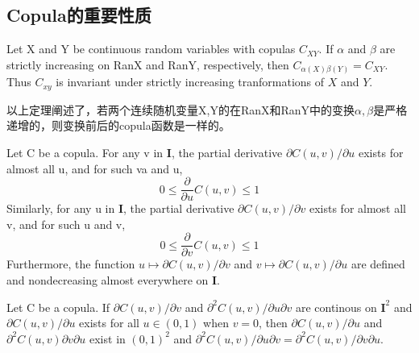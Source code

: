 \subsection{Copula的重要性质}
\begin{theorem}
    Let X and Y be continuous random variables with copulas $C_{XY}$. If $\alpha$ and $\beta$ are strictly increasing on RanX and RanY, respectively, then $C_{\alpha(X)\beta(Y)} = C_{XY}$. Thus \textcolor[rgb]{1,0,0}{$C_{xy}$ is invariant under strictly increasing tranformations of $X$ and $Y$}.
    \label{thr2.4.3}
\end{theorem}
以上定理阐述了，若两个连续随机变量X,Y的在RanX和RanY中的变换$\alpha,\beta$是严格递增的，则变换前后的copula函数是一样的。
\begin{theorem}
    Let C be a copula. For any v in $\mathbf{I}$, the partial derivative $\partial C(u,v)/\partial u$ exists for almost all u, and for such va and u,
    \begin{equation}
        0 \leq \dfrac{\partial}{\partial u}C(u,v) \leq 1
        \label{eq-partialu}
    \end{equation}
    Similarly, for any u in $\mathbf{I}$, the partial derivative $\partial C(u,v)/\partial v$ exists for almost all v, and for such u and v,
    \begin{equation}
        0\leq \dfrac{\partial}{\partial v} C(u,v) \leq 1
        \label{eq-partialv}
    \end{equation}
    Furthermore, the function $u \mapsto \partial C(u,v)/\partial v$ and $v\mapsto \partial C(u,v)/\partial u$ are defined and nondecreasing almost everywhere on $\mathbf{I}$.
    \label{thr-2.2.7}
\end{theorem}

\begin{theorem}
    Let C be a copula. If $\partial C(u,v)/\partial v$ and $\partial^2C(u,v)/\partial u\partial v$ are continous on $\mathbf{I}^2$ and $\partial C(u,v)/\partial u$ exists for all $u \in (0,1)$ when $v = 0$, then $\partial C(u,v)/\partial u$ and $\partial^2C(u,v)\partial v\partial u$ exist in $(0,1)^2$ and $\partial^2C(u,v)/\partial u\partial v = \partial^2C(u,v)/\partial v \partial u$.
    \label{thr-2.2.8}
\end{theorem}



